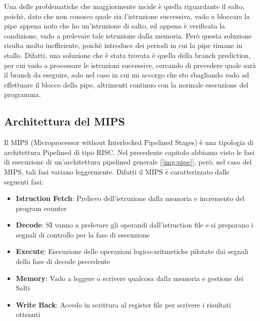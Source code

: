 Una delle problematiche che maggiormente incide è quella riguardante il salto, poichè, dato che non conosco quale sia l'istruzione successiva, vado a bloccare la pipe appena noto che ho un'istruzione di salto, ed appena è verificata la condizione, vado a prelevare tale istruzione dalla memoria. Però questa soluzione risulta molto inefficiente, poichè introduce dei periodi in cui la pipe rimane in stallo. Difatti, una soluzione che è stata trovata è quella della branch prediction, per cui vado a processare le istruzioni successive, cercando di prevedere quale sarà il branch da eseguire, solo nel caso in cui mi accorgo che sto sbagliando vado ad effettuare il blocco della pipe, altrimenti continuo con la normale esecuzione del programma.

\subsection{Architettura del MIPS}
Il MIPS (Microprocessor without Interlocked Pipelined Stages) è una tipologia di architettura Pipelined di tipo RISC.
Nel precedente capitolo abbiamo visto le fasi di esecuzione di un'architettura pipelined generale [\ref{img:pipe}], però, nel caso del MIPS, tali fasi variano leggermente. Difatti il MIPS è caratterizzato dalle seguenti fasi:
\begin{itemize}
    \item \textbf{Istruction Fetch}: Prelievo dell'istruzione dalla memoria e incremento del program counter
    \item \textbf{Decode}: SI vanno a prelevare gli operandi dall'istruction file e si preparano i segnali di controllo per la fase di esecuzione
    \item \textbf{Execute}: Esecuzione delle operazioni logico-aritmetiche pilotate dai segnali della fase di decode precedente
    \item \textbf{Memory}: Vado a leggere o scrivere qualcosa dalla memoria e gestione dei Salti
    \item \textbf{Write Back}: Accedo in scrittura al register file per scrivere i risultati ottenuti
\end{itemize}

